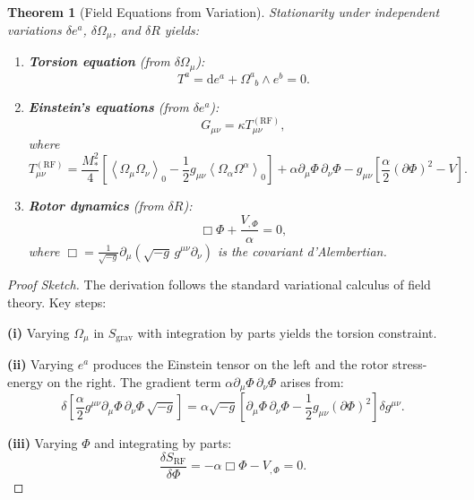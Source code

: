 \documentclass[11pt,a4paper]{article}
\numberwithin{equation}{section}
\theoremstyle{plain}
\newtheorem{theorem}{Theorem}[section]
\theoremstyle{definition}
\theoremstyle{remark}
\newcommand{\grade}[2]{\left\langle #1 \right\rangle_{#2}}
\newcommand{\scal}[1]{\grade{#1}{0}}       %
\newcommand{\dd}{\mathrm{d}}
\begin{document}
\begin{theorem}[Field Equations from Variation]
Stationarity under independent variations $\delta e^a$, $\delta\Omega_\mu$, and $\delta R$ yields:
\begin{enumerate}
\item \textbf{Torsion equation} (from $\delta\Omega_\mu$):
\begin{equation}
T^a = \dd e^a + \Omega^a_{\phantom{a}b} \wedge e^b = 0.
\label{eq:field-torsion}
\end{equation}

\item \textbf{Einstein's equations} (from $\delta e^a$):
\begin{equation}
G_{\mu\nu} = \kappa T_{\mu\nu}^{(\mathrm{RF})},
\label{eq:einstein-derived}
\end{equation}
where
\begin{equation}
T_{\mu\nu}^{(\mathrm{RF})} = \frac{M_*^2}{4}\left[\scal{\Omega_\mu\Omega_\nu} - \frac{1}{2}g_{\mu\nu}\scal{\Omega_\alpha\Omega^\alpha}\right] + \alpha\partial_\mu\Phi\,\partial_\nu\Phi - g_{\mu\nu}\left[\frac{\alpha}{2}(\partial\Phi)^2 - V\right].
\label{eq:stress-energy-tensor}
\end{equation}

\item \textbf{Rotor dynamics} (from $\delta R$):
\begin{equation}
\Box\Phi + \frac{V_{,\Phi}}{\alpha} = 0,
\label{eq:rotor-kg}
\end{equation}
where $\Box = \frac{1}{\sqrt{-g}}\partial_\mu(\sqrt{-g}\,g^{\mu\nu}\partial_\nu)$ is the covariant d'Alembertian.
\end{enumerate}
\end{theorem}

\begin{proof}[Proof Sketch]
The derivation follows the standard variational calculus of field theory. Key steps:

\textbf{(i)} Varying $\Omega_\mu$ in $S_{\mathrm{grav}}$ with integration by parts yields the torsion constraint.

\textbf{(ii)} Varying $e^a$ produces the Einstein tensor on the left and the rotor stress-energy on the right. The gradient term $\alpha\partial_\mu\Phi\,\partial_\nu\Phi$ arises from:
\begin{equation}
\delta\left[\frac{\alpha}{2}g^{\mu\nu}\partial_\mu\Phi\,\partial_\nu\Phi\,\sqrt{-g}\right] = \alpha\sqrt{-g}\left[\partial_\mu\Phi\,\partial_\nu\Phi - \frac{1}{2}g_{\mu\nu}(\partial\Phi)^2\right]\delta g^{\mu\nu}.
\end{equation}

\textbf{(iii)} Varying $\Phi$ and integrating by parts:
\begin{equation}
\frac{\delta S_{\mathrm{RF}}}{\delta\Phi} = -\alpha\Box\Phi - V_{,\Phi} = 0.
\end{equation}
\end{proof}
\end{document}
